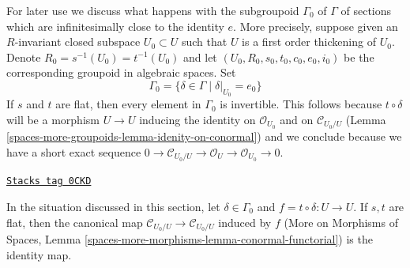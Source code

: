 \medskip\noindent
For later use we discuss what happens with the subgroupoid
$\Gamma_0$ of $\Gamma$ of sections which are infinitesimally
close to the identity $e$. More precisely, suppose given an
$R$-invariant closed subspace $U_0 \subset U$ such that $U$
is a first order thickening of $U_0$. Denote
$R_0 = s^{-1}(U_0) = t^{-1}(U_0)$ and let
$(U_0, R_0, s_0, t_0, c_0, e_0, i_0)$ be the corresponding
groupoid in algebraic spaces. Set
$$
\Gamma_0 = \{\delta \in \Gamma \mid \delta|_{U_0} = e_0\}
$$
If $s$ and $t$ are flat, then every element in $\Gamma_0$
is invertible. This follows because $t \circ \delta$
will be a morphism $U \to U$ inducing the identity on
$\mathcal{O}_{U_0}$ and on $\mathcal{C}_{U_0/U}$
(Lemma \ref{spaces-more-groupoids-lemma-idenity-on-conormal})
and we conclude because we have a short exact
sequence
$0 \to \mathcal{C}_{U_0/U} \to \mathcal{O}_U \to \mathcal{O}_{U_0} \to 0$.

\begin{lemma}
\label{spaces-more-groupoids-lemma-idenity-on-conormal}
\href{https://stacks.math.columbia.edu/tag/0CKD}{\texttt{Stacks tag 0CKD}}

In the situation discussed in this section, let $\delta \in \Gamma_0$
and $f = t \circ \delta : U \to U$. If $s, t$ are flat, then the
canonical map $\mathcal{C}_{U_0/U} \to \mathcal{C}_{U_0/U}$ induced by $f$
(More on Morphisms of Spaces, Lemma
\ref{spaces-more-morphisms-lemma-conormal-functorial})
is the identity map.
\end{lemma}

